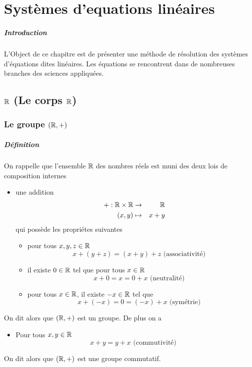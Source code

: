 \chapter{Systèmes d'equations linéaires}

\paragraph{Introduction} L'Object de ce chapitre est de présenter une méthode de résolution des systèmes d'équations dites linéaires. Les équations se rencontrent dans de nombreuses branches des sciences appliquées.
%
%
\section{$\mathbb{R}$ (Le corps $\mathbb{R}$)}
%
%
%
\subsection{Le groupe $(\mathbb{R}, +)$}
%
\paragraph{Définition} On rappelle que l'ensemble $\mathbb{R}$ des nombres réels est muni des deux lois de composition internes
\begin{itemize}
  \item une addition 
    \begin{eqnarray*}
      +: \mathbb{R} \times \mathbb{R} &\rightarrow& \mathbb{R} \\
      (x, y) &\mapsto& x+y
    \end{eqnarray*}
    qui possède les propriétes suivantes
    \begin{itemize}
      \item pour tous $x, y, z \in \mathbb{R}$
        $$x + (y + z) = (x + y) + z \text{ (associativité) }$$
      \item il existe $0 \in \mathbb{R}$ tel que pour tous $x \in \mathbb{R}$
        $$x + 0 = x = 0 + x \text{ (neutralité) }$$
      \item pour tous $x \in \mathbb{R}$, il existe $-x \in \mathbb{R}$ tel que
        $$x + (-x) = 0 = (-x) + x \text{ (symétrie) }$$
    \end{itemize}
\end{itemize}
On dit alors que $(\mathbb{R}, +)$ est un groupe. De plus on a
\begin{itemize}
  \item Pour tous $x, y \in \mathbb{R}$
    $$x + y = y + x \text{ (commutivité) }$$
\end{itemize}
On dit alors que $(\mathbb{R}, +)$ est une groupe commutatif.

